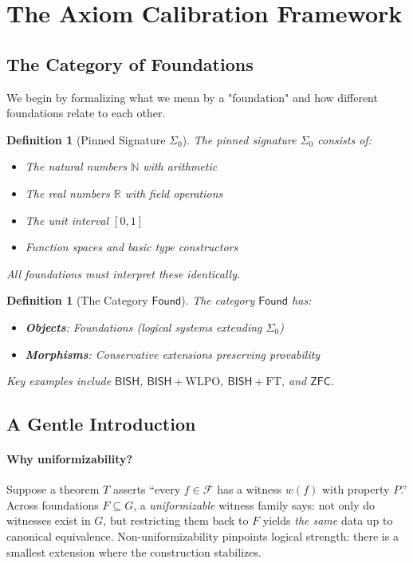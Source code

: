 \documentclass[11pt]{article}
\newtheorem{definition}[theorem]{Definition}
\newcommand{\N}{\mathbb{N}}
\newcommand{\R}{\mathbb{R}}
\newcommand{\WLPO}{\mathrm{WLPO}}
\newcommand{\FT}{\mathrm{FT}}
\newcommand{\BISH}{\mathsf{BISH}}
\newcommand{\ZFC}{\mathsf{ZFC}}
\newcommand{\Found}{\mathsf{Found}}
\newcommand{\SigmaZero}{\Sigma_{0}}
\begin{document}
\section{The Axiom Calibration Framework}

\subsection{The Category of Foundations}

We begin by formalizing what we mean by a "foundation" and how different foundations relate to each other.

\begin{definition}[Pinned Signature $\SigmaZero$]
The \emph{pinned signature} $\SigmaZero$ consists of:
\begin{itemize}
\item The natural numbers $\N$ with arithmetic
\item The real numbers $\R$ with field operations
\item The unit interval $[0,1]$
\item Function spaces and basic type constructors
\end{itemize}
All foundations must interpret these identically.
\end{definition}

\begin{definition}[The Category $\Found$]
The category $\Found$ has:
\begin{itemize}
\item \textbf{Objects}: Foundations (logical systems extending $\SigmaZero$)
\item \textbf{Morphisms}: Conservative extensions preserving provability
\end{itemize}
Key examples include $\BISH$, $\BISH + \WLPO$, $\BISH + \FT$, and $\ZFC$.
\end{definition}

\subsection{A Gentle Introduction}\label{subsec:gently}

\paragraph{Why uniformizability?}
Suppose a theorem $T$ asserts ``every $f\in\mathcal{F}$ has a witness $w(f)$ with property $P$.''
Across foundations $F\subseteq G$, a \emph{uniformizable} witness family says:
not only do witnesses exist in $G$, but restricting them back to $F$ yields \emph{the same} data up to canonical equivalence. Non-uniformizability pinpoints logical strength: there is a smallest extension where the construction stabilizes.
\end{document}
